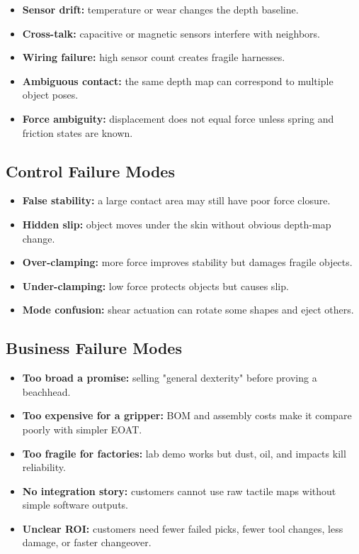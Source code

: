 \documentclass[11pt]{article}
\begin{document}
\begin{itemize}[leftmargin=*]
  \item \textbf{Sensor drift:} temperature or wear changes the depth baseline.
  \item \textbf{Cross-talk:} capacitive or magnetic sensors interfere with neighbors.
  \item \textbf{Wiring failure:} high sensor count creates fragile harnesses.
  \item \textbf{Ambiguous contact:} the same depth map can correspond to multiple object poses.
  \item \textbf{Force ambiguity:} displacement does not equal force unless spring and friction states are known.
\end{itemize}

\subsection{Control Failure Modes}

\begin{itemize}[leftmargin=*]
  \item \textbf{False stability:} a large contact area may still have poor force closure.
  \item \textbf{Hidden slip:} object moves under the skin without obvious depth-map change.
  \item \textbf{Over-clamping:} more force improves stability but damages fragile objects.
  \item \textbf{Under-clamping:} low force protects objects but causes slip.
  \item \textbf{Mode confusion:} shear actuation can rotate some shapes and eject others.
\end{itemize}

\subsection{Business Failure Modes}

\begin{itemize}[leftmargin=*]
  \item \textbf{Too broad a promise:} selling "general dexterity" before proving a beachhead.
  \item \textbf{Too expensive for a gripper:} BOM and assembly costs make it compare poorly with simpler EOAT.
  \item \textbf{Too fragile for factories:} lab demo works but dust, oil, and impacts kill reliability.
  \item \textbf{No integration story:} customers cannot use raw tactile maps without simple software outputs.
  \item \textbf{Unclear ROI:} customers need fewer failed picks, fewer tool changes, less damage, or faster changeover.
\end{itemize}
\end{document}
